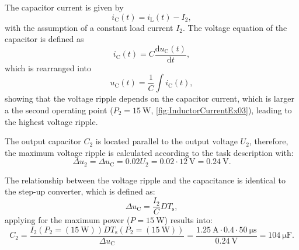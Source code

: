  
\begin{solutionblock}
    The capacitor current is given by
    \begin{equation}
        i_{\mathrm{C}}(t) = i_{\mathrm{L}}(t)-I_{\mathrm{2}},
    \end{equation}
    with the assumption of a constant load current $I_2$.
    The voltage equation of the capacitor is defined as
    \begin{equation}
        i_{\mathrm{C}}(t) = C\frac{\mathrm{d}u_{\mathrm{C}}(t)}{\mathrm{d}t},
    \end{equation}
    which is rearranged into
    \begin{equation}
        u_{\mathrm{C}}(t) = \frac{1}{C} \int i_{\mathrm{C}}(t),
    \end{equation}
    showing that the voltage ripple depends on the capacitor current, which is larger a the second operating point ($P_2 = \SI{15}{\watt}$, \autoref{fig:InductorCurrentEx03}), leading to the highest voltage ripple.
\end{solutionblock}


\begin{solutionblock}
    The output capacitor $C_2$ is located parallel to the output voltage $U_2$, therefore, the maximum voltage ripple is calculated according to the task description with:
    \begin{equation}
        \Delta u_2 = \Delta u_{\mathrm{C}} = 0.02 U_2 = 0.02 \cdot \SI{12}{\volt} = \SI{0.24}{\volt}.
    \end{equation}

    The relationship between the voltage ripple and the capacitance is identical to the step-up converter, which is defined as:
    \begin{equation}
        \Delta u_{\mathrm{C}} = \frac{I_2}{C} D T_{\mathrm{s}},
    \end{equation}
    applying for the maximum power ($P = \SI{15}{\watt}$) results into:
    \begin{equation}
        C_2 = \frac{I_{\mathrm{2}}(P_\mathrm{2}=(\SI{15}{\watt})) D T_{\mathrm{s}}(P_\mathrm{2}=(\SI{15}{\watt}))}{\Delta u_{\mathrm{C}}}
        = \frac{\SI{1.25}{\ampere} \cdot 0.4 \cdot \SI{50}{\micro\second}}{\SI{0.24}{\volt}}
        = \SI{104}{\micro\farad}. 
    \end{equation}

\end{solutionblock}

